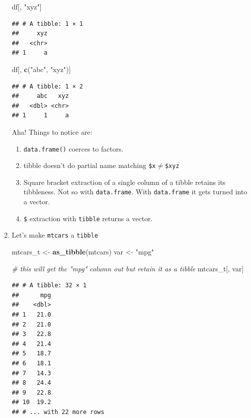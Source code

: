 \documentclass[]{book}
\newenvironment{Shaded}{\begin{snugshade}}{\end{snugshade}}
\newcommand{\KeywordTok}[1]{\textcolor[rgb]{0.13,0.29,0.53}{\textbf{{#1}}}}
\newcommand{\StringTok}[1]{\textcolor[rgb]{0.31,0.60,0.02}{{#1}}}
\newcommand{\CommentTok}[1]{\textcolor[rgb]{0.56,0.35,0.01}{\textit{{#1}}}}
\newcommand{\NormalTok}[1]{{#1}}
\providecommand{\tightlist}{%
  \setlength{\itemsep}{0pt}\setlength{\parskip}{0pt}}
\theoremstyle{definition}
\theoremstyle{definition}
\theoremstyle{remark}
\begin{document}
\begin{enumerate}
\begin{Shaded}
\begin{Highlighting}[]
\NormalTok{df[, }\StringTok{"xyz"}\NormalTok{]}
\end{Highlighting}
\end{Shaded}

\begin{verbatim}
## # A tibble: 1 × 1
##     xyz
##   <chr>
## 1     a
\end{verbatim}

\begin{Shaded}
\begin{Highlighting}[]
\NormalTok{df[, }\KeywordTok{c}\NormalTok{(}\StringTok{"abc"}\NormalTok{, }\StringTok{"xyz"}\NormalTok{)]}
\end{Highlighting}
\end{Shaded}

\begin{verbatim}
## # A tibble: 1 × 2
##     abc   xyz
##   <dbl> <chr>
## 1     1     a
\end{verbatim}

  Aha! Things to notice are:

  \begin{enumerate}
  \def\labelenumii{\alph{enumii}.}
  \tightlist
  \item
    \texttt{data.frame()} coerces to factors.
  \item
    tibble doesn't do partial name matching
    \texttt{\$x}\(\neq\)\texttt{\$xyz}
  \item
    Square bracket extraction of a single column of a tibble retains its
    tibbleness. Not so with \texttt{data.frame}. With
    \texttt{data.frame} it gets turned into a vector.
  \item
    \texttt{\$} extraction with \texttt{tibble} returns a vector.
  \end{enumerate}
\item
  Let's make \texttt{mtcars} a \texttt{tibble}

\begin{Shaded}
\begin{Highlighting}[]
\NormalTok{mtcars_t <-}\StringTok{ }\KeywordTok{as_tibble}\NormalTok{(mtcars)}
\NormalTok{var <-}\StringTok{ "mpg"}

\CommentTok{# this will get the "mpg" column out but retain it as a tibble}
\NormalTok{mtcars_t[, var]}
\end{Highlighting}
\end{Shaded}

\begin{verbatim}
## # A tibble: 32 × 1
##      mpg
##    <dbl>
## 1   21.0
## 2   21.0
## 3   22.8
## 4   21.4
## 5   18.7
## 6   18.1
## 7   14.3
## 8   24.4
## 9   22.8
## 10  19.2
## # ... with 22 more rows
\end{verbatim}


\end{enumerate}
\end{document}
